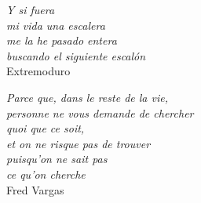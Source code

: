 \thispagestyle{empty}

\vspace*{\fill}
\begin{flushleft}
\textit{Y si fuera \\
mi vida una escalera \\
me la he pasado entera \\
buscando el siguiente escal\'on} \\
\vspace{0.05in}
Extremoduro
\end{flushleft}

\vspace*{\fill}
\begin{flushright}
\textit{Parce que, dans le reste de la vie, \\
personne ne vous demande de chercher \\
quoi que ce soit,\\
et on ne risque pas de trouver\\
puisqu'on ne sait pas \\
ce qu'on cherche} \\
\vspace{0.05in}
Fred Vargas
\end{flushright}
\vspace*{\fill}



\vspace{5in}

